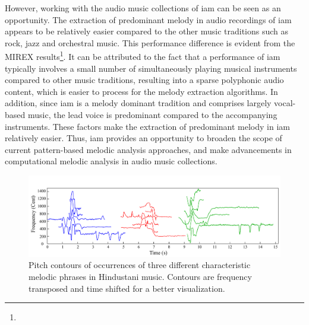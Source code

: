 However, working with the audio music collections of \gls{iam} can be seen as an opportunity.  The extraction of predominant melody in audio recordings of \gls{iam} appears to be relatively easier compared to the other music traditions such as rock, jazz and orchestral music. This performance difference is evident from the MIREX results\footnote{}. It can be attributed to the fact that a performance of \gls{iam} typically involves a small number of simultaneously playing musical instruments compared to other music traditions, resulting into a sparse polyphonic audio content, which is easier to process for the melody extraction algorithms. In addition, since \gls{iam} is a melody dominant tradition and comprises largely vocal-based music, the lead voice is predominant compared to the accompanying instruments. These factors make the extraction of predominant melody in \gls{iam} relatively easier. Thus, \gls{iam} provides an opportunity to broaden the scope of current pattern-based melodic analysis approaches, and make advancements in computational melodic analysis in audio music collections.

\begin{figure}
	\begin{center}
		\includegraphics[width=\figSizeHundred]{ch01_introduction/figures/phraseClassesExample.pdf}
	\end{center}
	\caption{Pitch contours of occurrences of three different characteristic melodic phrases in Hindustani music. Contours are frequency transposed and time shifted for a better visualization.}
	\label{fig:phraseComplexityExample_intro}
\end{figure}


